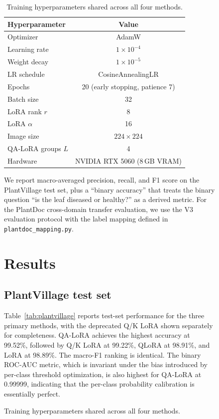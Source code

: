 \documentclass[conference]{IEEEtran}
\begin{document}
\begin{figure}[htbp]
\begin{table}[htbp]
\caption{Training hyperparameters shared across all four methods.}
\begin{center}
\begin{tabular}{|l|c|}
\hline
\textbf{Hyperparameter} & \textbf{Value} \\
\hline
Optimizer & AdamW \\
Learning rate & $1 \times 10^{-4}$ \\
Weight decay & $1 \times 10^{-5}$ \\
LR schedule & CosineAnnealingLR \\
Epochs & 20 (early stopping, patience 7) \\
Batch size & 32 \\
LoRA rank $r$ & 8 \\
LoRA $\alpha$ & 16 \\
Image size & $224 \times 224$ \\
QA-LoRA groups $L$ & 4 \\
Hardware & NVIDIA RTX 5060 (8\,GB VRAM) \\
\hline
\end{tabular}
\label{tab:hparams}
\end{center}
\end{table}

We report macro-averaged precision, recall, and F1 score on the PlantVillage test set, plus a ``binary accuracy'' that treats the binary question ``is the leaf diseased or healthy?'' as a derived metric. For the PlantDoc cross-domain transfer evaluation, we use the V3 evaluation protocol with the label mapping defined in \texttt{plantdoc\_mapping.py}.

\section{Results}\label{sec:results}
\subsection{PlantVillage test set}
Table~\ref{tab:plantvillage} reports test-set performance for the three primary methods, with the deprecated Q/K LoRA shown separately for completeness. QA-LoRA achieves the highest accuracy at 99.52\%, followed by Q/K LoRA at 99.22\%, QLoRA at 98.91\%, and LoRA at 98.89\%. The macro-F1 ranking is identical. The binary ROC-AUC metric, which is invariant under the bias introduced by per-class threshold optimization, is also highest for QA-LoRA at 0.99999, indicating that the per-class probability calibration is essentially perfect.


\end{figure}
\end{document}

